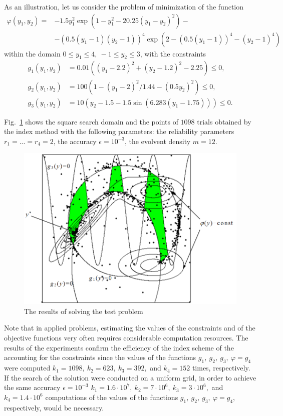 \begin{example} \label{6_example1}
As an illustration, let us consider the problem of minimization of the function
\begin{align*}
 \varphi(y_1,y_2) = &-1.5y_1^2\exp(1-y_1^2-20.25(y_1-y_2)^2)- \\
				            &-(0.5(y_1-1)(y_2-1))^4\exp(2-(0.5(y_1-1))^4-(y_2-1)^4)
\end{align*}
within the domain $0 \leq y_1\leq 4,\ -1\leq y_2\leq 3$, with the constraints 
\begin{align*}
g_1(y_1,y_2)&=0.01((y_1-2.2)^2+(y_2-1.2)^2-2.25)\leq 0,\\
g_2(y_1,y_2)&=100(1-(y_1-2)^2/1.44-(0.5y_2)^2)\leq 0,\\
g_3(y_1,y_2)&=10(y_2-1.5-1.5\sin(6.283(y_1-1.75)))\leq 0.
\end{align*}

Fig.~\ref{6_fig_5} shows the square search domain and the points of $1098$ trials obtained by the index method with the following parameters: the reliability parameters $r_1=...=r_4=2$, the accuracy $\epsilon = 10^{-3}$, the evolvent density $m=12$.
\begin{figure}[t]
\includegraphics[width=0.8\linewidth]{figures/6_5.png}
\caption{The results of solving the test problem}
\label{6_fig_5}     
\end{figure}

\end{example}

Note that in applied problems, estimating the values of the constraints and of the objective functions very often requires considerable computation resources. The results of the experiments confirm the efficiency of the index scheme of the accounting for the constraints since the values of the functions $g_1,\ g_2,\ g_3,\ \varphi = g_4$ were computed $k_1=1098,\ k_2=623,\ k_3=392,$ and $k_4=152$ times, respectively. If the search of the solution were conducted on a uniform grid, in order to achieve the same accuracy $\epsilon=10^{-3}$ $k_1=1.6\cdot 10^7,\ k_2=7 \cdot 10^6,\ k_3=3\cdot 10^6,$ and $k_4=1.4 \cdot 10^6$ computations of the values of the functions $g_1,\ g_2,\ g_3,\ \varphi = g_4$, respectively, would be necessary.

